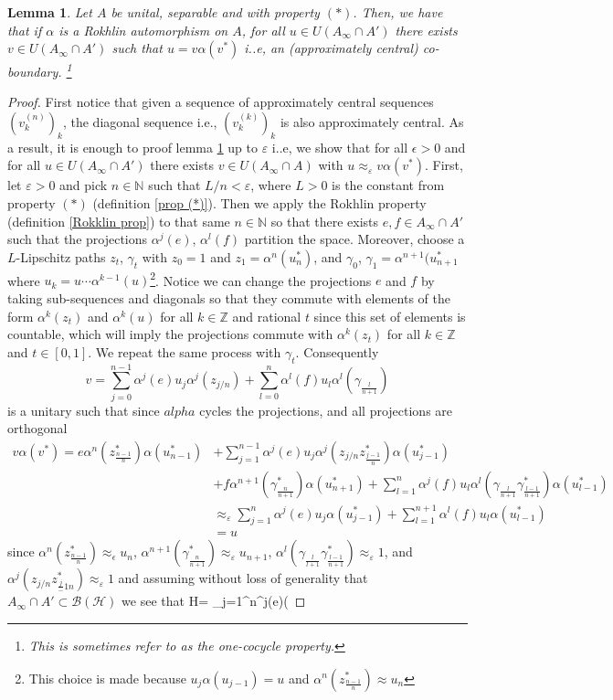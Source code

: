 \documentclass[11pt,a4paper,oneside]{amsart}
\newtheorem{lemma}[theorem]{Lemma}
\begin{document}
\begin{lemma}
\label{approx}
Let $A$ be unital, separable and with property $(*)$. Then, we have that if $\alpha$ is a Rokhlin automorphism on $A$, for all $u\in U(A_\infty\cap A')$ there exists $v\in U(A_\infty\cap A')$ such that $u=v\alpha(v^*)$ i..e, an (approximately central) co-boundary. \footnote{This is sometimes refer to as the \textit{one-cocycle property}.}
\end{lemma}
\begin{proof}
First notice that given a sequence of approximately central sequences $(v_k^{(n)})_k$, the diagonal sequence i.e., $(v^{(k)}_k)_k$ is also approximately central. As a result, it is enough to proof lemma \ref{approx} up to $\varepsilon$ i..e, we show that for all $\epsilon>0$ and for all $u\in U(A_\infty\cap A')$ there exists $v\in U(A_\infty\cap A)$ with $u\approx_\varepsilon v\alpha(v^*)$. First, let $\varepsilon>0$ and pick $n\in \mathbb{N}$ such that $L/n<\varepsilon$, where $L>0$ is the constant from property $(*)$ (definition \ref{prop (*)}). Then we apply the Rokhlin property (definition \ref{Rokklin prop}) to that same $n\in \mathbb{N}$ so that there exists $e,f\in A_\infty\cap A'$ such that the projections $\alpha^j(e)$, $\alpha^l(f)$ partition the space. Moreover, choose a $L$-Lipschitz paths $z_t$, $\gamma_t$ with $z_0=1$ and $z_1=\alpha^n(u_n^*)$, and $\gamma_0$, $\gamma_1=\alpha^{n+1}(u_{n+1}^*$ where $u_k=u\cdots \alpha^{k-1}(u)$\footnote{This choice is made because $u_j\alpha(u_{j-1})=u$ and $\alpha^n(z^*_{\frac{n-1}{n}})\approx u_n$}. Notice we can change the projections $e$ and $f$ by taking sub-sequences and diagonals so that they commute with elements of the form $\alpha^k(z_t)$ and $\alpha^k(u)$ for all $k\in \mathbb{Z}$ and rational $t$ since this set of elements is countable, which will imply the projections commute with $\alpha^k(z_t)$ for all $k\in \mathbb{Z}$ and $t\in [0,1]$. We repeat the same process with $\gamma_t$. Consequently $$v=\sum_{j=0}^{n-1}\alpha^j(e)u_j\alpha^j(z_{j/n})+\sum_{l=0}^{n}\alpha^l(f)u_l\alpha^l(\gamma_{\frac{l}{n+1}})$$ is a unitary such that since $alpha$ cycles the projections, and all projections are orthogonal \begin{align*}v\alpha(v^*)= e \alpha^n(z^*_{\frac{n-1}{n}})\alpha(u^*_{n-1})& +\sum_{j=1}^{n-1}\alpha^j(e)u_j\alpha^j(z_{j/n}z^*_{\frac{j-1}{n}})\alpha(u^*_{j-1})\\& + f\alpha^{n+1}(\gamma^*_{\frac{n}{n+1}})\alpha(u^*_{n+1})+\sum_{l=1}^{n}\alpha^j(f)u_l\alpha^l(\gamma_{\frac{l}{n+1}}\gamma^*_{\frac{l-1}{n+1}})\alpha(u^*_{l-1})\\& \approx_\varepsilon \sum_{j=1}^{n}\alpha^j(e)u_j\alpha(u_{j-1}^*)+\sum_{l=1}^{n+1}\alpha^l(f)u_l\alpha(u_{l-1}^*)\\&= u\end{align*} since $\alpha^n(z^*_{\frac{n-1}{n}})\approx_\epsilon u_n$, $\alpha^{n+1}(\gamma^*_{\frac{n}{n+1}})\approx_\varepsilon u_{n+1}$, $\alpha^l(\gamma_{\frac{l}{l+1}}\gamma^*_{\frac{l-1}{n+1}})\approx_{\varepsilon} 1$, and $\alpha^j(z_{j/n}z^*_{\frac{j}-1{n}})\approx_\varepsilon 1$ and assuming without loss of generality that $A_\infty\cap A'\subset \mathcal B(\mathcal H)$ we see that $$\mathcal H= \bigoplus_{j=1}^{n}\alpha^j(e)(\mathcal 
\end{proof}
\end{document}
